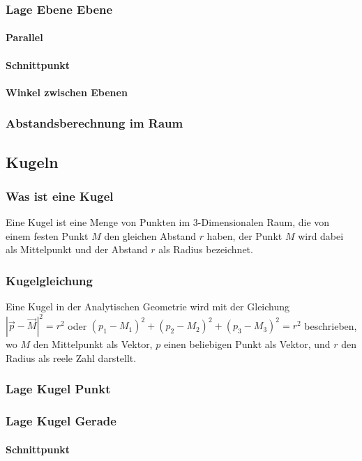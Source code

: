 \documentclass[a4paper]{article} %
\begin{document}
	\subsubsection{Lage Ebene Ebene}
	\paragraph{Parallel}
	\paragraph{Schnittpunkt}
	\paragraph{Winkel zwischen Ebenen}
	\subsubsection{Abstandsberechnung im Raum}
	\subsection{Kugeln}
	\subsubsection{Was ist eine Kugel}
	Eine Kugel ist eine Menge von Punkten im 3-Dimensionalen Raum, die von einem festen Punkt $M$ den gleichen Abstand $r$ haben,
	der Punkt $M$ wird dabei als Mittelpunkt und der Abstand $r$ als Radius bezeichnet.
	\subsubsection{Kugelgleichung}
	Eine Kugel in der Analytischen Geometrie wird mit der Gleichung\\ $|\vec{p}-\vec{M}|^2=r^2$ oder
	$(p_1-M_1)^2+(p_2-M_2)^2+(p_3-M_3)^2=r^2$ beschrieben, wo $M$ den Mittelpunkt als Vektor, $p$ einen beliebigen Punkt als Vektor, und $r$ den Radius als reele Zahl darstellt.
	\subsubsection{Lage Kugel Punkt}
	\subsubsection{Lage Kugel Gerade}
	\paragraph{Schnittpunkt}
\end{document}

